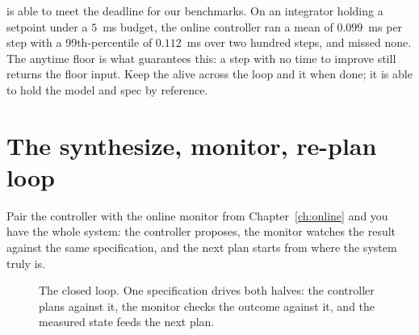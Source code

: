\begin{notebox}
\sentil{} is able to meet the deadline for our benchmarks. On an integrator holding a setpoint under a $5$~ms budget, the online controller ran a mean of $0.099$~ms per step with a 99th-percentile of $0.112$~ms over two hundred steps, and missed none. The anytime floor is what guarantees this: a step with no time to improve still returns the floor input. Keep the  alive across the loop and  it when done; it is able to hold the model and spec by reference.
\end{notebox}

\section{The synthesize, monitor, re-plan loop}

Pair the controller with the online monitor from Chapter~\ref{ch:online} and you have the whole system: the controller proposes, the monitor watches the result against the same specification, and the next plan starts from where the system truly is.

\begin{figure}[h]
\centering
\begin{widefig}\end{widefig}
\caption{The closed loop. One specification drives both halves: the controller plans against it, the monitor checks the outcome against it, and the measured state feeds the next plan.}
\end{figure}

